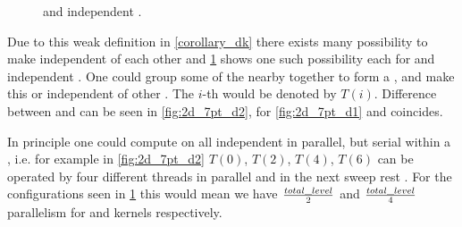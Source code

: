  \begin{figure}[tbhp]
 	\centering
 	\hspace{2.5em}
 	\caption{\DONE and \DTWO independent \levelGroups.}
 	\label{fig:2d-7pt_d1_d2}
 \end{figure}
 
  Due to this weak definition in \cref{corollary_dk} there exists many possibility to make \levels independent of each other and \cref{fig:2d-7pt_d1_d2} shows one such possibility each for \DONE and \DTWO independent \levels. One could group some of the nearby \levels together to form a \levelGroup, and make this \DONE or \DTWO independent of other \levelGroups. The $i$-th \levelGroup would be denoted by $T(i)$. Difference between \level and  \levelGroup can be seen in \cref{fig:2d_7pt_d2}, for \cref{fig:2d_7pt_d1} \levelGroup and \level coincides.
  
  In principle one could compute on all independent \levelGroups in parallel, but serial within a \levelGroup, i.e. for example in \cref{fig:2d_7pt_d2} $T(0)$, $T(2)$, $T(4)$, $T(6)$ can be operated by four different threads in parallel and in the next sweep rest \levelGroups. For the configurations seen in \cref{fig:2d-7pt_d1_d2} this would mean we have $\frac{total\_level}{2}$ and $\frac{total\_level}{4}$ parallelism for \DONE and \DTWO kernels respectively.
  
